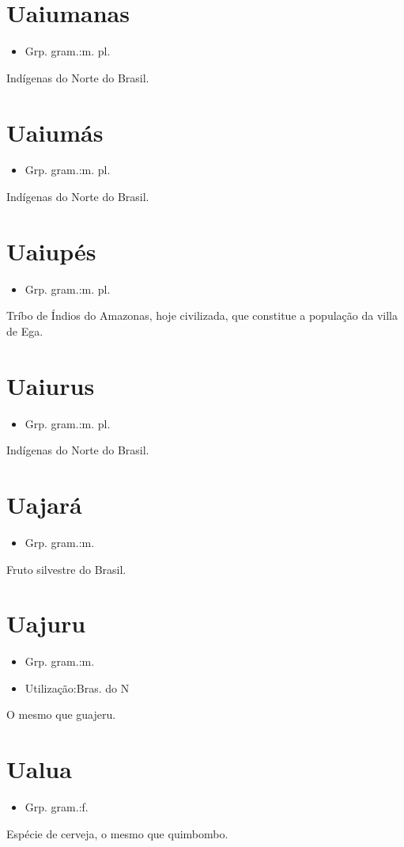 \documentclass{article}
\begin{document}
\section{Uaiumanas}
\begin{itemize}
\item {Grp. gram.:m. pl.}
\end{itemize}
Indígenas do Norte do Brasil.
\section{Uaiumás}
\begin{itemize}
\item {Grp. gram.:m. pl.}
\end{itemize}
Indígenas do Norte do Brasil.
\section{Uaiupés}
\begin{itemize}
\item {Grp. gram.:m. pl.}
\end{itemize}
Tríbo de Índios do Amazonas, hoje civilizada, que constitue a população da villa de Ega.
\section{Uaiurus}
\begin{itemize}
\item {Grp. gram.:m. pl.}
\end{itemize}
Indígenas do Norte do Brasil.
\section{Uajará}
\begin{itemize}
\item {Grp. gram.:m.}
\end{itemize}
Fruto silvestre do Brasil.
\section{Uajuru}
\begin{itemize}
\item {Grp. gram.:m.}
\end{itemize}
\begin{itemize}
\item {Utilização:Bras. do N}
\end{itemize}
O mesmo que \textunderscore guajeru\textunderscore .
\section{Ualua}
\begin{itemize}
\item {Grp. gram.:f.}
\end{itemize}
Espécie de cerveja, o mesmo que \textunderscore quimbombo\textunderscore .
\end{document}
